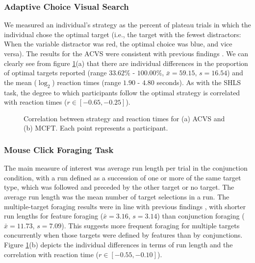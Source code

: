 \documentclass[twocolumn]{article}
\begin{document}
\subsubsection{Adaptive Choice Visual Search}
 
We measured an individual's strategy as the percent of plateau trials in which the individual chose the optimal target (i.e., the target with the fewest distractors: When the variable distractor was red, the optimal choice was blue, and vice versa). The results for the ACVS were consistent with previous findings \cite{irons-leber2016,irons-leber2018}. We can clearly see from figure \ref{fig:acvs_mcft_summary}(a) that there are individual differences in the proportion of optimal targets reported (range $33.62\%$ - $100.00\%$, $\bar{x} = 59.15$, $s = 16.54$) and the mean ($\log_2$) reaction times (range $1.90$ - $4.80$ seconds). As with the SHLS task, the degree to which participants follow the optimal strategy is correlated with reaction times ($r \in [-0.65, -0.25]$).

\begin{figure}
\centering
{}
\caption{Correlation between strategy and reaction times for (a) ACVS and (b) MCFT. Each point represents a participant.}
\label{fig:acvs_mcft_summary}
\end{figure}

\subsubsection{Mouse Click Foraging Task}
 
The main measure of interest was average run length per trial in the conjunction condition, with a run defined as a succession of one or more of the same target type, which was followed and preceded by the other target or no target. The average run length was the mean number of target selections in a run. The multiple-target foraging results were in line with previous findings \cite{kristjansson2014,johannesson2016}, with shorter run lengths for feature foraging ($\bar{x} = 3.16$, $s = 3.14$) than conjunction foraging ($\bar{x} = 11.73$, $s = 7.09$). This suggests more frequent foraging for multiple targets concurrently when those targets were defined by features than by conjunctions. Figure \ref{fig:acvs_mcft_summary}(b) depicts the individual differences in terms of run length and the correlation with reaction time ($r \in [-0.55, -0.10]$).
\end{document}
